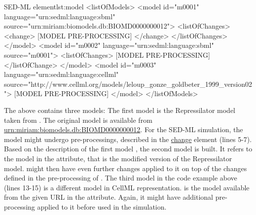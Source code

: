%
\begin{myXmlLst}{SED-ML  element}{lst:model}
<listOfModels>
 <model id="m0001" language="urn:sedml:language:sbml" 
  source="urn:miriam:biomodels.db:BIOMD0000000012">
  <listOfChanges>
   <change>
    [MODEL PRE-PROCESSING]
   </change>
   </listOfChanges> 
 </model>
 <model id="m0002" language="urn:sedml:language:sbml" source="m0001">
  <listOfChanges>
   [MODEL PRE-PROCESSING]
  </listOfChange>
 </model>
 <model id="m0003" language="urn:sedml:language:cellml" source="http://www.cellml.org/models/leloup_gonze_goldbeter_1999_version02">
  [MODEL PRE-PROCESSING]
 </model>
</listOfModels>
\end{myXmlLst} 
%

The above  contains three models: 
The first model  is the Repressilator model taken from \biom. 
The original model is available from \url{urn:miriam:biomodels.db:BIOMD0000000012}. 
For the SED-ML simulation, the model might undergo pre-processings, described in the \hyperref[class:change]{change} element (lines 5-7).
Based on the description of the first model , the second model is built. 
It refers to the model  in the  attribute, that is the modified version of the Repressilator model.
 might then have even further changes applied to it on top of the changes defined in the pre-processing of .
The third model in the code example above (lines 13-15) is a different model in CellML representation.  is the model available from the given URL in the  attribute. Again, it might have additional pre-processing applied to it before used in the simulation.

  

  


